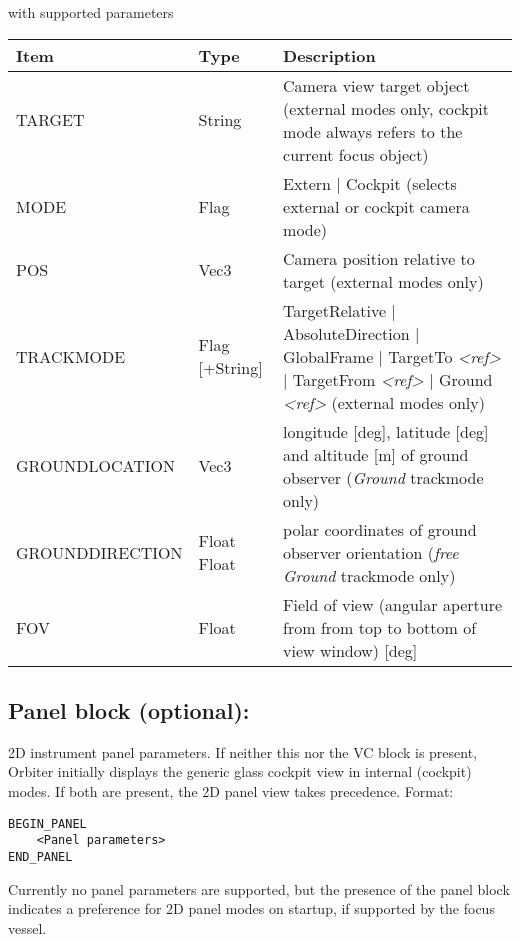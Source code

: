 \documentclass[Orbiter Developer Manual.tex]{subfiles}
\begin{document}
\noindent
with supported parameters

\begin{table}[H]
	\centering
	\begin{tabularx}{\textwidth}{ |l|l|X| }
	\hline\rule{0pt}{2ex}
	\textbf{Item} & \textbf{Type} & \textbf{Description}\\
	\hline\rule{0pt}{2ex}
	TARGET & String & Camera view target object (external modes only, cockpit mode always refers to the current focus object)\\
	\hline\rule{0pt}{2ex}
	MODE & Flag & Extern | Cockpit (selects external or cockpit camera mode)\\
	\hline\rule{0pt}{2ex}
	POS & Vec3 & Camera position relative to target (external modes only)\\
	\hline\rule{0pt}{2ex}
	TRACKMODE & Flag [+String] & TargetRelative | AbsoluteDirection | GlobalFrame | TargetTo \textit{<ref>} | TargetFrom \textit{<ref>} | Ground \textit{<ref>} (external modes only)\\
	\hline\rule{0pt}{2ex}
	GROUNDLOCATION & Vec3 & longitude [deg], latitude [deg] and altitude [m] of ground observer (\textit{Ground} trackmode only)\\
	\hline\rule{0pt}{2ex}
	GROUNDDIRECTION & Float Float & polar coordinates of ground observer orientation (\textit{free Ground} trackmode only)\\
	\hline\rule{0pt}{2ex}
	FOV & Float & Field of view (angular aperture from from top to bottom of view window) [deg]\\
	\hline
	\end{tabularx}
\end{table}

\subsection*{Panel block (optional):}
2D instrument panel parameters. If neither this nor the VC block is present, Orbiter initially displays the generic glass cockpit view in internal (cockpit) modes. If both are present, the 2D panel view takes precedence. Format:

\begin{lstlisting}[language=OSFS]
BEGIN_PANEL
	<Panel parameters>
END_PANEL
\end{lstlisting}

\noindent
Currently no panel parameters are supported, but the presence of the panel block indicates a preference for 2D panel modes on startup, if supported by the focus vessel.
\end{document}
